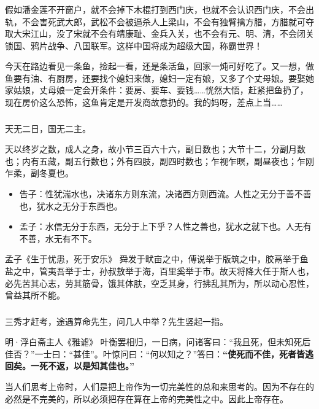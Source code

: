 \documentclass[UTF8,aspectratio=43,11pt,colorlinks,compress,openany]{beamer}%
\begin{document}
\begin{frame}\frametitle{}
\begin{block}{}
假如潘金莲不开窗户，就不会掉下木棍打到西门庆，也就不会认识西门庆，不会出轨，不会害死武大郎，武松不会被逼杀人上梁山，不会有独臂擒方腊，方腊就可夺取大宋江山，没了宋就不会有靖康耻、金兵入关，也不会有元、明、清，不会闭关锁国、鸦片战争、八国联军。这样中国将成为超级大国，称霸世界！
\end{block}
\begin{block}{}
今天在路边看见一条鱼，捡起一看，还是条活鱼，回家一炖可好吃了。又一想，做鱼要有油、有厨房，还要找个媳妇来做，媳妇一定有娘，又多了个丈母娘。要娶她家姑娘，丈母娘一定会开条件：要房、要车、要钱……恍然大悟，赶紧把鱼扔了，现在房价这么恐怖，这鱼肯定是开发商故意扔的。我的妈呀，差点上当……
\end{block}
\end{frame}

\begin{frame}\frametitle{}
\begin{block}{}
天无二日，国无二主。
\end{block}
\begin{block}{}
天以终岁之数，成人之身，故小节三百六十六，副日数也；大节十二，分副月数也；内有五藏，副五行数也；外有四肢，副四时数也；乍视乍瞑，副昼夜也；乍刚乍柔，副冬夏也。
\end{block}
\begin{block}{}
\begin{itemize}
	\item 告子：性犹湍水也，决诸东方则东流，决诸西方则西流。人性之无分于善不善也，犹水之无分于东西也。
	\item 孟子：水信无分于东西，无分于上下乎？人性之善也，犹水之就下也。人无有不善，水无有不下。
\end{itemize}
\end{block}
\begin{block}{孟子《生于忧患，死于安乐》}
舜发于畎亩之中，傅说举于版筑之中，胶鬲举于鱼盐之中，管夷吾举于士，孙叔敖举于海，百里奚举于市。故天将降大任于斯人也，必先苦其心志，劳其筋骨，饿其体肤，空乏其身，行拂乱其所为，所以动心忍性，曾益其所不能。
\end{block}
\end{frame}

\begin{frame}\frametitle{}
\begin{block}{}
三秀才赶考，途遇算命先生，问几人中举？先生竖起一指。
\end{block}
\begin{block}{明·浮白斋主人《雅谑》}
叶衡罢相归，一日病，问诸客曰：“我且死，但未知死后佳否？”一士曰：“甚佳”。叶惊问曰：“何以知之？”答曰：\textbf{“使死而不佳，死者皆逃回矣。一死不返，以是知其佳也。”}
\end{block}
\begin{block}{}
当人们思考上帝时，人们是把上帝作为一切完美性的总和来思考的。因为不存在的必然是不完美的，所以必须把存在算在上帝的完美性之中。因此上帝存在。
\end{block}
\end{frame}
\end{document}

